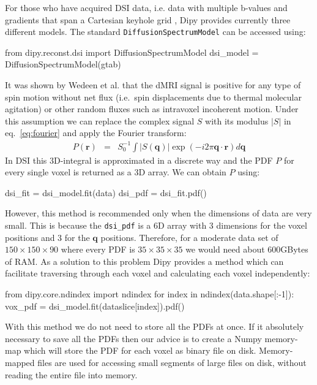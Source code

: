 \documentclass{bioinfo}
\begin{document}
For those who have acquired DSI data, i.e. data with multiple b-values
and gradients that span a Cartesian keyhole grid \citep{tuch:02,
  wedeen-hagmann-etal:05, Garyfallidis_thesis}, Dipy provides currently three
different models. The standard \texttt{DiffusionSpectrumModel} can be
accessed using:
\begin{python}
from dipy.reconst.dsi import DiffusionSpectrumModel
dsi_model = DiffusionSpectrumModel(gtab)
\end{python}
It was shown by Wedeen et al. \citep{wedeen-hagmann-etal:05} that the dMRI
signal is positive for any type of spin motion without net flux (i.e.~spin
displacements due to thermal molecular agitation) or other random fluxes such
as intravoxel incoherent motion. Under this assumption we can replace the
complex signal $S$ with its modulus $|S|$ in eq.~\ref{eq:fourier} and apply the
Fourier transform:
\begin{eqnarray}
P(\mathbf{r}) & = &
S_{0}^{-1}\int|S(\mathbf{q})|\exp(-i2\pi\mathbf{q}\cdot\mathbf{r})d\mathbf{q}\label{eq:P_modulus}
\end{eqnarray}
In DSI this 3D-integral is approximated in a discrete way and the
PDF $P$ for every single voxel is returned as a 3D array. We can obtain
$P$ using:
\begin{python}
dsi_fit = dsi_model.fit(data)
dsi_pdf = dsi_fit.pdf()
\end{python}
However, this method is recommended only when the dimensions of data are very
small. This is because the \texttt{dsi\_pdf} is a 6D array with 3 dimensions
for the voxel positions and 3 for the $\mathbf{q}$ positions. Therefore, for a
moderate data set of $150\times150\times90$ where every PDF is
$35\times35\times35$ we would need about 600GBytes of RAM. As a solution to
this problem Dipy provides a method which can facilitate traversing through
each voxel and calculating each voxel independently:
\begin{python}
from dipy.core.ndindex import ndindex
for index in ndindex(data.shape[:-1]):
    vox_pdf = dsi_model.fit(dataslice[index]).pdf()
\end{python}
With this method we do not need to store all the PDFs at once. If it absolutely
necessary to save all the PDFs then our advice is to create a Numpy memory-map
which will store the PDF for each voxel as binary file on disk. Memory-mapped
files are used for accessing small segments of large files on disk, without
reading the entire file into memory.
\end{document}
